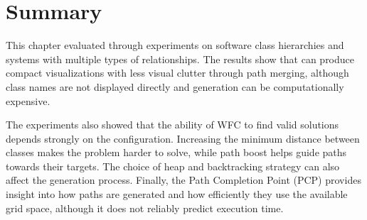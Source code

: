 \documentclass[../../main.tex]{subfiles}
\begin{document}





\section{Summary}

This chapter evaluated \wassis through experiments on software class hierarchies and systems with multiple types of relationships. The results show that \wassis can produce compact visualizations with less visual clutter through path merging, although class names are not displayed directly and generation can be computationally expensive.

The experiments also showed that the ability of WFC to find valid solutions depends strongly on the configuration. Increasing the minimum distance between classes makes the problem harder to solve, while path boost helps guide paths towards their targets. The choice of heap and backtracking strategy can also affect the generation process. Finally, the Path Completion Point (PCP) provides insight into how paths are generated and how efficiently they use the available grid space, although it does not reliably predict execution time.
\end{document}
